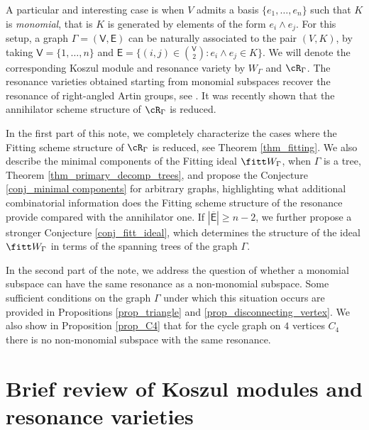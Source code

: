 \documentclass[10pt, leqno]{amsart}
\begin{document}
A particular and interesting case is when $V$ admits a basis $\{e_1, \ldots, e_n \}$ such that $K$ is \emph{monomial}, that is $K$ is generated by elements of the form $e_i \wedge e_j$. For this setup, a graph $\Gamma = (\mathsf{V}, \mathsf{E})$ can be naturally associated to the pair $(V,K)$, by taking $\mathsf{V} = \{1,\ldots, n\}$ and $\mathsf{E} = \{(i,j)\in \binom{\mathsf{V}}{2} : e_i \wedge e_j \in K \}$. We will denote the corresponding Koszul module and resonance variety by $W_\Gamma$ and $\cR_\Gamma$. The resonance varieties obtained starting from monomial subspaces recover the resonance of right-angled Artin groups, see \cite{papadima_2006}. It was recently shown \cite{aprodu_higher_2024} that the annihilator scheme structure of $\cR_\Gamma$ is reduced. 

\medskip

In the first part of this note, we completely characterize the cases where the Fitting scheme structure of $\cR_\Gamma$ is reduced, see Theorem \ref{thm_fitting}. We also describe the minimal components of the Fitting ideal $\fitt W_\Gamma$, when $\Gamma$ is a tree, Theorem \ref{thm_primary_decomp_trees}, and propose the Conjecture \ref{conj_minimal components} for arbitrary graphs, highlighting what additional combinatorial information does the Fitting scheme structure of the resonance provide compared with the annihilator one. If $| \overline{\mathsf{E}} | \ge n - 2$, we further propose a stronger Conjecture \ref{conj_fitt_ideal}, which determines the structure of the ideal $\fitt W_\Gamma$ in terms of the spanning trees of the graph $\Gamma$.

In the second part of the note, we address the question of whether a monomial subspace can have the same resonance as a non-monomial subspace. Some sufficient conditions on the graph $\Gamma$ under which this situation occurs are provided in Propositions \ref{prop_triangle} and \ref{prop_disconnecting_vertex}. We also show in Proposition \ref{prop_C4} that for the cycle graph on $4$ vertices $C_4$ there is no non-monomial subspace with the same resonance. 

\section{Brief review of Koszul modules and resonance varieties}
\label{sec:2}
\end{document}
